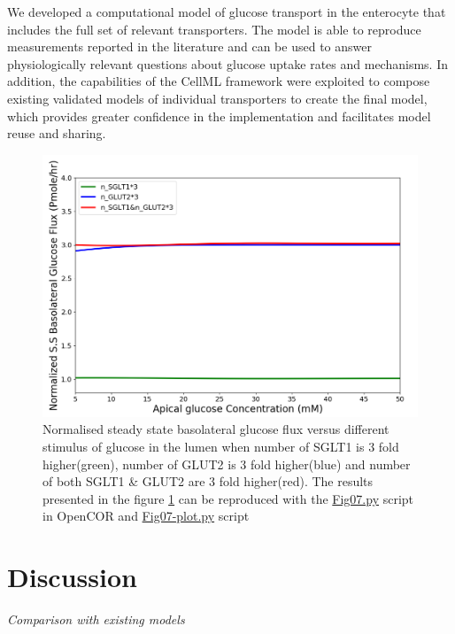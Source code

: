 \documentclass[fleqn,10pt]{physiome}
\begin{document}
We developed a computational model of glucose transport in the enterocyte that includes the full set of relevant transporters. The model is able to reproduce measurements reported in the literature and can be used to answer physiologically relevant questions about glucose uptake rates and mechanisms. In addition, the capabilities of the CellML framework were exploited to compose existing validated models of individual transporters to create the final model, which provides greater confidence in the implementation and facilitates model reuse and sharing.
\begin{figure}[H]
\centering
\includegraphics[width=0.8\linewidth]{fig07.png}
\caption{Normalised steady state basolateral glucose flux versus different stimulus of glucose in the  lumen when  number of SGLT1 is 3 fold higher(green), number of GLUT2  is 3 fold higher(blue) and number of both SGLT1 \& GLUT2 are 3 fold higher(red). The results presented in the figure \ref{fig07} can be reproduced with the \href{https://models.physiomeproject.org/workspace/572/file/c052b0c460280139dad150937fbee4fa6a026505/SEDML_files/Fig07.py}{Fig07.py} script in OpenCOR and \href{https://models.physiomeproject.org/workspace/572/file/c052b0c460280139dad150937fbee4fa6a026505/SEDML_files/Fig07_plot.py}{Fig07-plot.py} script}
\label{fig07}
\end{figure}

\section{Discussion}

\textit{Comparison with existing models}\newline
\end{document}

